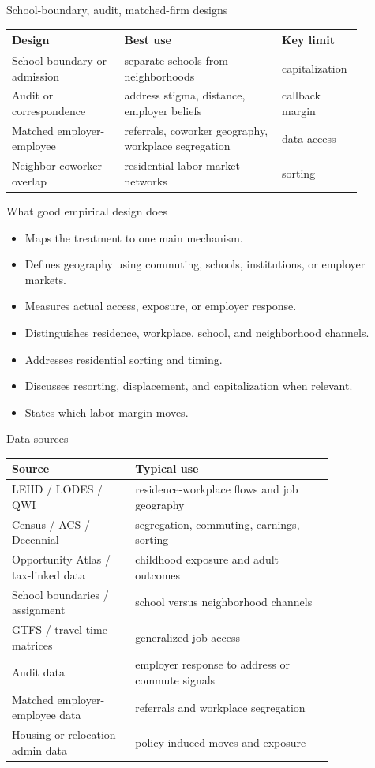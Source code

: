 \documentclass[aspectratio=169,11pt]{beamer}
\begin{document}
\begin{frame}{School-boundary, audit, matched-firm designs}
\small
\begin{tabular}{p{0.30\linewidth} p{0.42\linewidth} p{0.16\linewidth}}
\toprule
Design & Best use & Key limit \\
\midrule
School boundary or admission & separate schools from neighborhoods & capitalization \\
Audit or correspondence & address stigma, distance, employer beliefs & callback margin \\
Matched employer-employee & referrals, coworker geography, workplace segregation & data access \\
Neighbor-coworker overlap & residential labor-market networks & sorting \\
\bottomrule
\end{tabular}
\end{frame}

\begin{frame}{What good empirical design does}
\begin{itemize}
    \item Maps the treatment to one main mechanism.
    \item Defines geography using commuting, schools, institutions, or employer markets.
    \item Measures actual access, exposure, or employer response.
    \item Distinguishes residence, workplace, school, and neighborhood channels.
    \item Addresses residential sorting and timing.
    \item Discusses resorting, displacement, and capitalization when relevant.
    \item States which labor margin moves.
\end{itemize}
\end{frame}

\begin{frame}{Data sources}
\small
\begin{tabular}{p{0.31\linewidth} p{0.50\linewidth}}
\toprule
Source & Typical use \\
\midrule
LEHD / LODES / QWI & residence-workplace flows and job geography \\
Census / ACS / Decennial & segregation, commuting, earnings, sorting \\
Opportunity Atlas / tax-linked data & childhood exposure and adult outcomes \\
School boundaries / assignment & school versus neighborhood channels \\
GTFS / travel-time matrices & generalized job access \\
Audit data & employer response to address or commute signals \\
Matched employer-employee data & referrals and workplace segregation \\
Housing or relocation admin data & policy-induced moves and exposure \\
\bottomrule
\end{tabular}
\end{frame}
\end{document}
